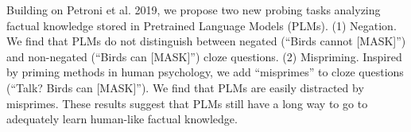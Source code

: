 Building on Petroni et al. 2019, we propose two new probing tasks analyzing factual knowledge stored in Pretrained Language Models (PLMs). (1) Negation. We find that PLMs do not distinguish between negated (``Birds cannot [MASK]'') and non-negated (``Birds can [MASK]'') cloze questions. (2) Mispriming. Inspired by priming methods in human psychology, we add ``misprimes'' to cloze questions (``Talk? Birds can [MASK]''). We find that PLMs are easily distracted by misprimes. These results suggest that PLMs still have a long way to go to adequately learn human-like factual knowledge.
